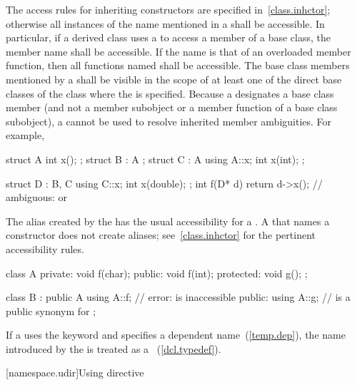 \pnum
{}%
The access rules for inheriting constructors are specified
in~\ref{class.inhctor}; otherwise all instances of the name mentioned in a
shall be accessible. In particular, if a derived class uses a
 to access a member of a base class, the
member name shall be accessible. If the name is that of an overloaded
member function, then all functions named shall be accessible. The base
class members mentioned by a  shall be
visible in the scope of at least one of the direct base classes of the
class where the  is specified. \enternote
Because a  designates a base class member
(and not a member subobject or a member function of a base class
subobject), a  cannot be used to resolve
inherited member ambiguities. For example,

\begin{codeblock}
struct A { int x(); };
struct B : A { };
struct C : A {
  using A::x;
  int x(int);
};

struct D : B, C {
  using C::x;
  int x(double);
};
int f(D* d) {
  return d->x();    // ambiguous:  or 
}
\end{codeblock}
\exitnote

\pnum
The alias created by the  has the usual
accessibility for a .
\enternote A  that names a constructor does not
create aliases; see~\ref{class.inhctor} for the pertinent accessibility rules.
\exitnote
\enterexample

\begin{codeblock}
class A {
private:
    void f(char);
public:
    void f(int);
protected:
    void g();
};

class B : public A {
  using A::f;       // error:  is inaccessible
public:
  using A::g;       //  is a public synonym for 
};
\end{codeblock}
\exitexample

\pnum
If a  uses the keyword  and
specifies a dependent name~(\ref{temp.dep}), the name introduced by the
 is treated as a
~(\ref{dcl.typedef}).%

[namespace.udir]{Using directive}%

